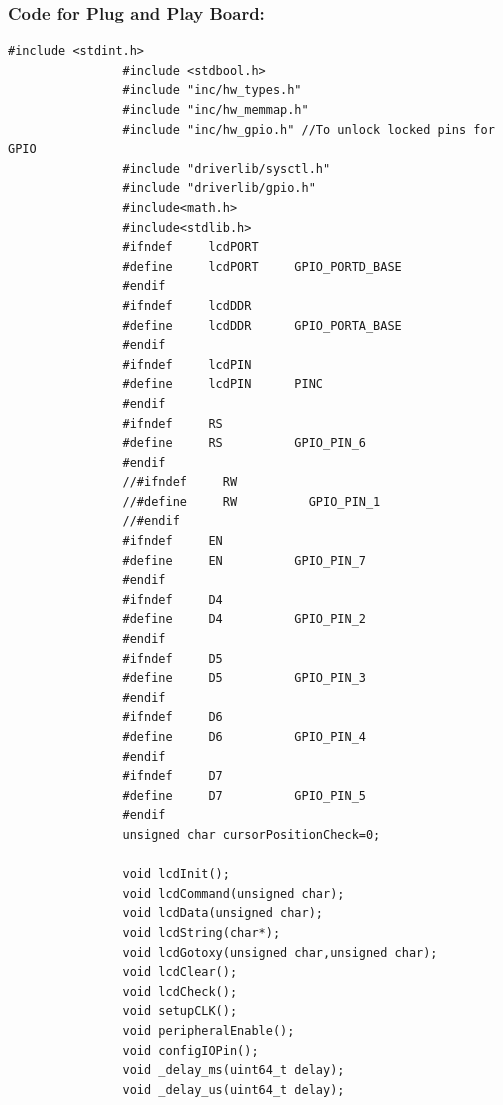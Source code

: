 \documentclass[a4paper,12pt,oneside]{article}
\begin{document}
			\subsubsection{\textbf{Code for Plug and Play Board:}}
			\begin{lstlisting}[style=CStyle]
				#include <stdint.h>
				#include <stdbool.h>
				#include "inc/hw_types.h"
				#include "inc/hw_memmap.h"
				#include "inc/hw_gpio.h" //To unlock locked pins for GPIO
				#include "driverlib/sysctl.h"
				#include "driverlib/gpio.h"
				#include<math.h>
				#include<stdlib.h>
				#ifndef     lcdPORT
				#define     lcdPORT     GPIO_PORTD_BASE
				#endif
				#ifndef     lcdDDR
				#define     lcdDDR      GPIO_PORTA_BASE
				#endif
				#ifndef     lcdPIN
				#define     lcdPIN      PINC
				#endif
				#ifndef     RS
				#define     RS          GPIO_PIN_6
				#endif
				//#ifndef     RW
				//#define     RW          GPIO_PIN_1
				//#endif
				#ifndef     EN
				#define     EN          GPIO_PIN_7
				#endif
				#ifndef     D4
				#define     D4          GPIO_PIN_2
				#endif
				#ifndef     D5
				#define     D5          GPIO_PIN_3
				#endif
				#ifndef     D6
				#define     D6          GPIO_PIN_4
				#endif
				#ifndef     D7
				#define     D7          GPIO_PIN_5
				#endif
				unsigned char cursorPositionCheck=0;
				
				void lcdInit();
				void lcdCommand(unsigned char);
				void lcdData(unsigned char);
				void lcdString(char*);
				void lcdGotoxy(unsigned char,unsigned char);
				void lcdClear();
				void lcdCheck();
				void setupCLK();
				void peripheralEnable();
				void configIOPin();
				void _delay_ms(uint64_t delay);
				void _delay_us(uint64_t delay);
				

\end{lstlisting}
\end{document}

